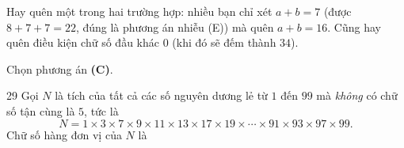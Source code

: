 {\begin{warnbox}Hay quên một trong hai trường hợp: nhiều bạn chỉ xét $a+b=7$ (được $8+7+7=22$, đúng là phương án nhiễu (E)) mà quên $a+b=16$. Cũng hay quên điều kiện chữ số đầu khác $0$ (khi đó sẽ đếm thành $34$).\end{warnbox}

Chọn phương án \textbf{(C)}.
}

\begin{probbox}{29}{\relax}
Gọi $N$ là tích của tất cả các số nguyên dương lẻ từ $1$ đến $99$ mà \emph{không} có chữ số tận cùng là $5$, tức là
\[N=1\times 3\times 7\times 9\times 11\times 13\times 17\times 19\times\cdots\times 91\times 93\times 97\times 99.\]
Chữ số hàng đơn vị của $N$ là
\end{probbox}
